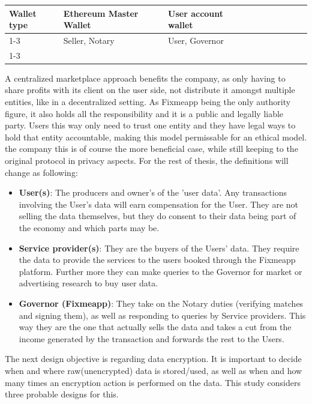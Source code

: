 \documentclass[english, 12pt, a4paper, sci, utf8, a-2b, online]{aaltothesis}
\theoremstyle{change}
\theoremstyle{theoremstyle}
\begin{document}
\begin{table}[h!]
\begin{tabular}{llllllllll}
\multicolumn{1}{|l|}{\cellcolor[HTML]{C0C0C0}Wallet type} & \multicolumn{1}{l|}{\cellcolor[HTML]{C0C0C0}Ethereum Master Wallet} & \multicolumn{1}{l|}{\cellcolor[HTML]{C0C0C0}User account wallet} &  &  &  &  &  &  &  \\ \cline{1-3}
\multicolumn{1}{|l|}{\cellcolor[HTML]{C0C0C0}Entities receiving compensation} & \multicolumn{1}{l|}{\cellcolor[HTML]{C0C0C0}Seller, Notary} & \multicolumn{1}{l|}{\cellcolor[HTML]{C0C0C0}User, Governor} &  &  &  &  &  &  &  \\ \cline{1-3}
\end{tabular}
\end{table}

A centralized marketplace approach benefits the company, as only having to share profits with its client on the user side, not distribute it amongst multiple entities, like in a decentralized setting. As Fixmeapp being the only authority figure, it also holds all the responsibility and it is a public and legally liable party. Users this way only need to trust one entity and they have legal ways to hold that entity accountable, making this model permissable for an ethical model.\\
 the company this is of course the more beneficial case, while still keeping to the original protocol in privacy aspects. For the rest of thesis, the definitions will change as following:
\begin{itemize}
    \item \textbf{User(s)}: The producers and owner's of the 'user data'. Any transactions involving the User's data will earn compensation for the User. They are not selling the data themselves, but they do consent to their data being part of the economy and which parts may be.
    \item \textbf{Service provider(s)}: They are the buyers of the Users' data. They require the data to provide the services to the users booked through the Fixmeapp platform. Further more they can make queries to the Governor for market or advertising research to buy user data.
    \item \textbf{Governor (Fixmeapp)}: They take on the Notary duties (verifying matches and signing them), as well as responding to queries by Service providers. This way they are the one that actually sells the data and takes a cut from the income generated by the transaction and forwards the rest to the Users.
\end{itemize}
The next design objective is regarding data encryption. It is important to decide when and where raw(unencrypted) data is stored/used, as well as when and how many times an encryption action is performed on the data. This study considers three probable designs for this.\\
\end{document}
